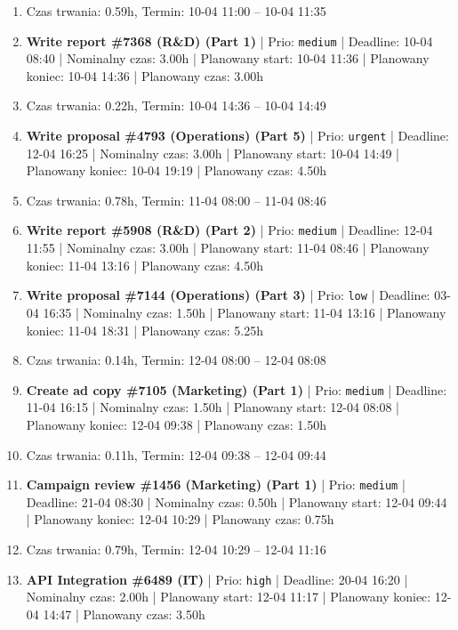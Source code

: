 {\begin{enumerate}
  \item [\textbf{PRZERWA}] Czas trwania: 0.59h, Termin: 10-04 11:00 -- 10-04 11:35
  \item [\textbf{14633}] \textbf{Write report \#7368 (R\&D) (Part 1)} | Prio: \texttt{medium} | Deadline: 10-04 08:40 | Nominalny czas: 3.00h | Planowany start: 10-04 11:36 | Planowany koniec: 10-04 14:36 | Planowany czas: 3.00h
  \item [\textbf{PRZERWA}] Czas trwania: 0.22h, Termin: 10-04 14:36 -- 10-04 14:49
  \item [\textbf{14600}] \textbf{Write proposal \#4793 (Operations) (Part 5)} | Prio: \texttt{urgent} | Deadline: 12-04 16:25 | Nominalny czas: 3.00h | Planowany start: 10-04 14:49 | Planowany koniec: 10-04 19:19 | Planowany czas: 4.50h
  \item [\textbf{PRZERWA}] Czas trwania: 0.78h, Termin: 11-04 08:00 -- 11-04 08:46
  \item [\textbf{14674}] \textbf{Write report \#5908 (R\&D) (Part 2)} | Prio: \texttt{medium} | Deadline: 12-04 11:55 | Nominalny czas: 3.00h | Planowany start: 11-04 08:46 | Planowany koniec: 11-04 13:16 | Planowany czas: 4.50h
  \item [\textbf{14702}] \textbf{Write proposal \#7144 (Operations) (Part 3)} | Prio: \texttt{low} | Deadline: 03-04 16:35 | Nominalny czas: 1.50h | Planowany start: 11-04 13:16 | Planowany koniec: 11-04 18:31 | Planowany czas: 5.25h
  \item [\textbf{PRZERWA}] Czas trwania: 0.14h, Termin: 12-04 08:00 -- 12-04 08:08
  \item [\textbf{14650}] \textbf{Create ad copy \#7105 (Marketing) (Part 1)} | Prio: \texttt{medium} | Deadline: 11-04 16:15 | Nominalny czas: 1.50h | Planowany start: 12-04 08:08 | Planowany koniec: 12-04 09:38 | Planowany czas: 1.50h
  \item [\textbf{PRZERWA}] Czas trwania: 0.11h, Termin: 12-04 09:38 -- 12-04 09:44
  \item [\textbf{14653}] \textbf{Campaign review \#1456 (Marketing) (Part 1)} | Prio: \texttt{medium} | Deadline: 21-04 08:30 | Nominalny czas: 0.50h | Planowany start: 12-04 09:44 | Planowany koniec: 12-04 10:29 | Planowany czas: 0.75h
  \item [\textbf{PRZERWA}] Czas trwania: 0.79h, Termin: 12-04 10:29 -- 12-04 11:16
  \item [\textbf{14620}] \textbf{API Integration \#6489 (IT)} | Prio: \texttt{high} | Deadline: 20-04 16:20 | Nominalny czas: 2.00h | Planowany start: 12-04 11:17 | Planowany koniec: 12-04 14:47 | Planowany czas: 3.50h

\end{enumerate}}
